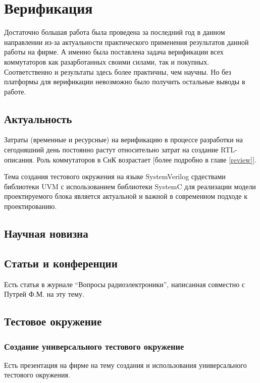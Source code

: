 
\chapter{Верификация}

Достаточно большая работа была проведена за последний год в данном направлении из-за актуальности практического применения результатов данной работы на фирме. А именно была поставлена задача верификации всех коммутаторов как разарботанных своими силами, так и покупных. Соответственно и результаты здесь более практичны, чем научны. Но без платформы для верификации невозможно было получить остальные выводы в работе.

\section{Актуальность}

Затраты (временные и ресурсные) на верификацию в процессе разработки на сегодняшний день постоянно растут относительно затрат на создание RTL-описания. Роль коммутаторов в СнК возрастает [{\color{red}более подробно в главе \ref{review}}].

Тема создания тестового окружения на языке SystemVerilog срдествами библиотеки UVM с использованием библиотеки SystemC для реализации модели проектируемого блока является актуальной и важной в современном подходе к проектированию.

\section{Научная новизна}

\section{Статьи и конференции}

Есть статья в журнале ``Вопросы радиоэлектроники'', написанная совместно с Путрей Ф.М. на эту тему.

\section{Тестовое окружение}

\subsection{Создание универсального тестового окружение}

Есть презентация на фирме на тему создания и использования универсального тестового окружения.

